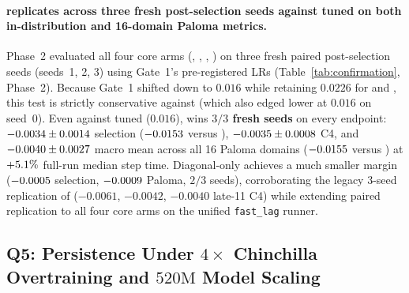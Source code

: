 \paragraph{ replicates across three fresh post-selection seeds against tuned  on both in-distribution and 16-domain Paloma metrics.}
Phase~2 evaluated all four core arms (, ,
, ) on three fresh paired post-selection seeds
(seeds~1, 2, 3) using Gate~1's pre-registered LRs (Table~\ref{tab:confirmation},
Phase~2). Because Gate~1 shifted  down to $0.016$ while retaining
$0.0226$ for  and , this test is strictly
conservative against  (which also edged lower at $0.016$ on
seed~0). Even against tuned  ($0.016$),  wins
\textbf{$3/3$ fresh seeds} on every endpoint:
$-0.0034{} \pm 0.0014{}$ selection
($-0.0153{}$ versus ),
$-0.0035{} \pm 0.0008{}$ C4, and
$-0.0040{} \pm 0.0027{}$ macro mean across
all 16 Paloma domains ($-0.0155{}$ versus ) at
$+5.1\%$ full-run median step time. Diagonal-only 
achieves a much smaller margin ($-0.0005{}$ selection,
$-0.0009{}$ Paloma, $2/3$ seeds), corroborating the legacy
3-seed replication of  ($-0.0061$, $-0.0042$, $-0.0040$ late-11
C4) while extending paired replication to all four core arms on the unified
\texttt{fast\_lag} runner.

\subsection{Q5: Persistence Under \texorpdfstring{$4\times$}{4x} Chinchilla Overtraining and \texorpdfstring{$520\text{M}$}{520M} Model Scaling}
\label{sec:res-q5}


